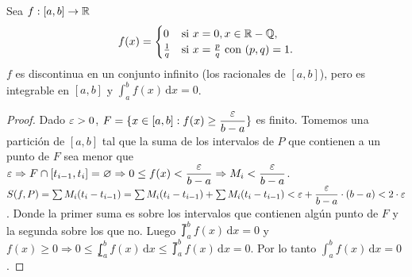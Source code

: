 \begin{eg}
  Sea $f: [a, b] \to \mathbb{R}$ \begin{equation}
    f(x) = \begin{cases}
      0 & \text{si } x = 0, x \in \mathbb{R} - \mathbb{Q}, \\
      \frac{1}{q} & \text{si } x = \frac{p}{q} \text{ con } (p, q) = 1.
    \end{cases}
  \end{equation}
  $f$ es discontinua en un conjunto infinito (los racionales de $[a, b]$), pero es integrable en $[a, b]$ y $\int_a^b f(x)\, \mathrm{d}x = 0$.
  \begin{proof}
    Dado $\varepsilon > 0$, $F = \{ x \in [a, b] : f(x) \geq \dfrac{\varepsilon}{b-a} \}$ es finito. Tomemos una partición de $[a, b]$ tal que la suma de los intervalos de $P$ que contienen a un punto de $F$ sea menor que $\varepsilon \Rightarrow F \cap [t_{i-1}, t_i] = \varnothing \Rightarrow 0 \leq f(x) < \dfrac{\varepsilon}{b-a} \Rightarrow M_i < \dfrac{\varepsilon}{b-a}$. \\
    $S(f, P) = \sum M_i (t_i - t_{i-1}) = \sum M_i (t_i - t_{i-1}) + \sum M_i (t_i - t_{i-1}) < \varepsilon + \dfrac{\varepsilon}{b-a} \cdot (b-a) < 2 \cdot \varepsilon$. Donde la primer suma es sobre los intervalos que contienen algún punto de $F$ y la segunda sobre los que no. Luego $\upint_a^b f(x) \, \mathrm{d}x = 0$ y $f(x) \geq 0 \Rightarrow 0 \leq \lowint_a^b f(x) \, \mathrm{d}x \leq \upint_a^b f(x) \, \mathrm{d}x = 0$.
    Por lo tanto $\int_a^b f(x) \, \mathrm{d}x = 0$.
  \end{proof}
\end{eg}
